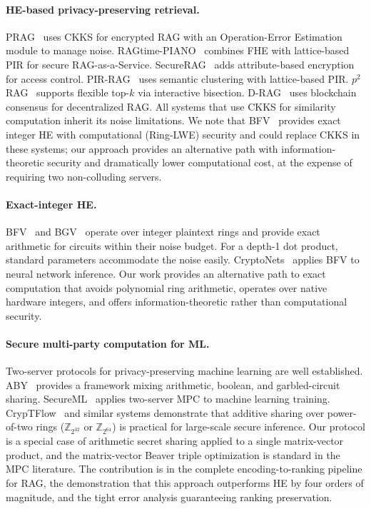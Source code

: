 \documentclass[11pt]{article}
\newcommand{\Z}{\mathbb{Z}}
\begin{document}
\paragraph{HE-based privacy-preserving retrieval.}
PRAG~\cite{prag2026} uses CKKS for encrypted RAG with an Operation-Error Estimation module to manage noise. RAGtime-PIANO~\cite{ragtimepiano2026} combines FHE with lattice-based PIR for secure RAG-as-a-Service. SecureRAG~\cite{securerag2025} adds attribute-based encryption for access control. PIR-RAG~\cite{pirrag2025} uses semantic clustering with lattice-based PIR. $p^2$RAG~\cite{p2rag2026} supports flexible top-$k$ via interactive bisection. D-RAG~\cite{drag2025} uses blockchain consensus for decentralized RAG. All systems that use CKKS for similarity computation inherit its noise limitations. We note that BFV~\cite{fan2012somewhat} provides exact integer HE with computational (Ring-LWE) security and could replace CKKS in these systems; our approach provides an alternative path with information-theoretic security and dramatically lower computational cost, at the expense of requiring two non-colluding servers.

\paragraph{Exact-integer HE.}
BFV~\cite{fan2012somewhat} and BGV~\cite{brakerski2014leveled} operate over integer plaintext rings and provide exact arithmetic for circuits within their noise budget. For a depth-1 dot product, standard parameters accommodate the noise easily. CryptoNets~\cite{gilad2016cryptonets} applies BFV to neural network inference. Our work provides an alternative path to exact computation that avoids polynomial ring arithmetic, operates over native hardware integers, and offers information-theoretic rather than computational security.

\paragraph{Secure multi-party computation for ML.}
Two-server protocols for privacy-preserving machine learning are well established. ABY~\cite{demmler2015aby} provides a framework mixing arithmetic, boolean, and garbled-circuit sharing. SecureML~\cite{mohassel2017secureml} applies two-server MPC to machine learning training. CrypTFlow~\cite{kumar2020cryptflow} and similar systems demonstrate that additive sharing over power-of-two rings ($\Z_{2^{32}}$ or $\Z_{2^{64}}$) is practical for large-scale secure inference. Our protocol is a special case of arithmetic secret sharing applied to a single matrix-vector product, and the matrix-vector Beaver triple optimization is standard in the MPC literature. The contribution is in the complete encoding-to-ranking pipeline for RAG, the demonstration that this approach outperforms HE by four orders of magnitude, and the tight error analysis guaranteeing ranking preservation.
\end{document}
